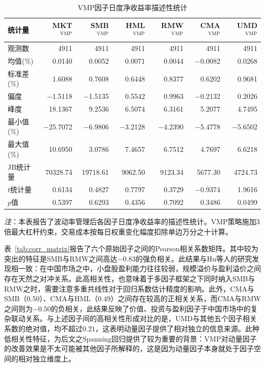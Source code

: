 \documentclass[
    decl-page,
    oneside,
  ]{njuthesis}
\begin{document}
\begin{table}[htbp]
\centering
\caption{VMP因子日度净收益率描述性统计}
\label{tab:desc_stats_vmp}
\small
\begin{tabular}{l*{6}{r}}
\toprule
统计量 & MKT$^{\text{VMP}}$ & SMB$^{\text{VMP}}$ & HML$^{\text{VMP}}$ & RMW$^{\text{VMP}}$ & CMA$^{\text{VMP}}$ & UMD$^{\text{VMP}}$ \\
\midrule
观测数 & 4911 & 4911 & 4911 & 4911 & 4911 & 4911 \\
均值(\%) & 0.0140 & 0.0052 & 0.0071 & 0.0044 & $-$0.0082 & 0.0268 \\
标准差(\%) & 1.6088 & 0.7608 & 0.6448 & 0.8377 & 0.6202 & 0.9681 \\
偏度 & $-$1.5118 & $-$1.5135 & 0.5542 & 0.9963 & $-$0.2132 & 0.2026 \\
峰度 & 18.1367 & 9.2536 & 6.5074 & 6.3161 & 5.2077 & 4.7495 \\
最小值(\%) & $-$25.7072 & $-$6.9806 & $-$3.2128 & $-$4.2390 & $-$5.4778 & $-$5.6502 \\
最大值(\%) & 10.6950 & 3.0786 & 7.4657 & 6.7512 & 4.7697 & 6.6218 \\
\midrule
JB统计量 & 70328.74 & 19718.61 & 9062.50 & 9123.34 & 5677.30 & 4724.73 \\
$t$统计量 & 0.6134 & 0.4827 & 0.7797 & 0.3729 & $-$0.9374 & 1.9616 \\
$p$值 & 0.5397 & 0.6293 & 0.4356 & 0.7092 & 0.3486 & 0.0499 \\
\bottomrule
\end{tabular}

\vspace{0.5em}
\begin{minipage}{0.95\textwidth}
\footnotesize
\textit{注}：本表报告了波动率管理后各因子日度净收益率的描述性统计。VMP策略施加3倍最大杠杆约束，交易成本按每日权重变化幅度扣除单边万分之十计算。
\end{minipage}
\end{table}

表~\ref{tab:corr_matrix}报告了六个原始因子之间的Pearson相关系数矩阵。其中较为突出的特征是SMB与RMW之间高达$-0.83$的强负相关。此结果与Hu等人\cite{hu2019chinese}的研究发现相一致：在中国市场之中，小盘股盈利能力往往较弱，规模溢价与盈利溢价之间存在天然之对冲关系。此高相关性，也意味着于多因子框架之下同时纳入SMB与RMW之时，需要注意多重共线性对于回归系数估计精度的影响。此外，CMA与SMB（$0.50$）、CMA与HML（$0.49$）之间存在较高的正相关关系，而CMA与RMW之间则为$-0.50$的负相关，此结果反映了价值、投资与盈利因子于中国市场中的复杂联动关系。与上述因子间的高相关性形成对比的是，UMD与其他五个因子相关系数的绝对值，均不超过$0.21$，这表明动量因子提供了相对独立的信息来源。此种低相关性特征，为后文之Spanning回归提供了较为重要的背景：VMP对动量因子的改善效果是不太可能被其他因子所解释的，这是因为动量因子本身就处于因子空间的相对独立维度上。
\end{document}
